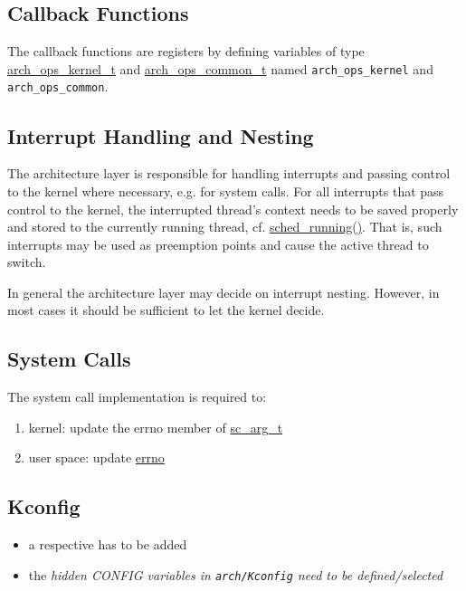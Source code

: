 	\subsection{Callback Functions}
		The callback functions are registers by defining variables of type \hyperref[structarch__ops__kernel__t]{arch\_ops\_kernel\_t} and \hyperref[structarch__ops__common__t]{arch\_ops\_common\_t} named \lstinline{arch_ops_kernel} and \lstinline{arch_ops_common}.

	\subsection{Interrupt Handling and Nesting}
		The architecture layer is responsible for handling interrupts and passing control to the kernel where necessary, e.g. for system calls. For all interrupts that pass control to the kernel, the interrupted thread's context needs to be saved properly and stored to the currently running thread, cf. \hyperref[kernel_2sched_8c_a34a33397e7197f803feffb423ce6717a]{sched\_running()}. That is, such interrupts may be used as preemption points and cause the active thread to switch.

		In general the architecture layer may decide on interrupt nesting. However, in most cases it should be sufficient to let the kernel decide.

	\subsection{System Calls}
		The system call implementation is required to:
		\begin{enumerate}
			\item kernel: update the errno member of \hyperref[sys_2syscall_8h_structsc__arg__t]{sc\_arg\_t}
			\item user space: update \hyperref[errno_8h_ad65a8842cc674e3ddf69355898c0ecbf]{errno}
		\end{enumerate}

	\subsection{Kconfig}
		\begin{itemize}
			\item a respective  has to be added
			\item the \it{hidden} CONFIG variables in \lstinline{arch/Kconfig} need to be defined/selected
		\end{itemize}

